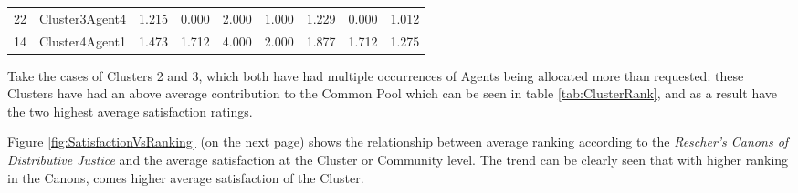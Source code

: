 \begin{table}[h]
{\begin{tabular}{@{}ccccccccc@{}}
22   & Cluster3Agent4 & 1.215                                                      & 0.000                                                          & 2.000        & 1.000                                                    & 1.229                                                      & 0.000                                                          & 1.012        \\
14   & Cluster4Agent1 & 1.473                                                      & 1.712                                                          & 4.000        & 2.000                                                    & 1.877                                                      & 1.712                                                          & 1.275        \\ \bottomrule
\end{tabular}
}
\end{table}

Take the cases of Clusters 2 and 3, which both have had multiple occurrences of Agents being allocated more than requested: these Clusters have had an above average contribution to the Common Pool which can be seen in table \ref{tab:ClusterRank}, and as a result have the two highest average satisfaction ratings.

Figure \ref{fig:SatisfactionVsRanking} (on the next page) shows the relationship between average ranking according to the \textit{Rescher's Canons of Distributive Justice} and the average satisfaction at the Cluster or Community level. The trend can be clearly seen that with higher ranking in the Canons, comes higher average satisfaction of the Cluster. 

